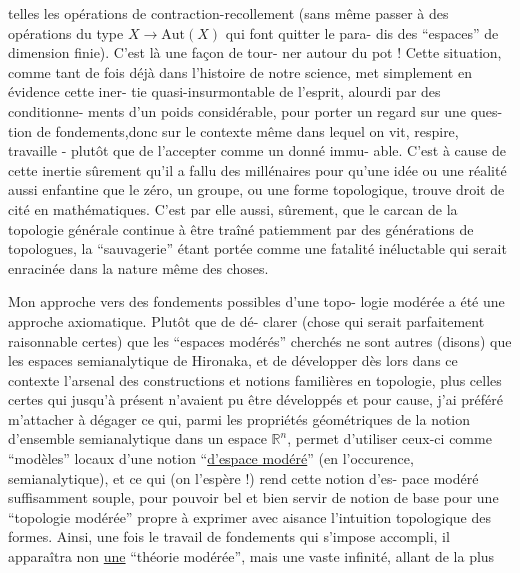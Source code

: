 
telles les opérations de contraction-recollement (sans même passer
à des opérations du type $X \longrightarrow \mathrm{Aut}(X)$ qui font quitter le para-%
dis des ``espaces'' de dimension finie). C'est là une façon de tour-%
ner autour du pot ! Cette situation, comme tant de fois déjà dans
l'histoire de notre science, met simplement en évidence cette iner-%
tie quasi-insurmontable de l'esprit, alourdi par des conditionne-%
ments d'un poids considérable, pour porter un regard sur une ques-%
tion de fondements,donc sur le contexte même dans lequel on vit,
respire, travaille - plutôt que de l'accepter comme un donné immu-%
able. C'est à cause de cette inertie sûrement qu'il a fallu des
millénaires pour qu'une idée ou une réalité aussi enfantine que
le zéro, un groupe, ou une forme topologique, trouve droit de cité
en mathématiques. C'est par elle aussi, sûrement, que le carcan
de la topologie générale continue à être traîné patiemment par
des générations de topologues, la ``sauvagerie'' étant portée comme
une fatalité inéluctable qui serait enracinée dans la nature même
des choses.

Mon approche vers des fondements possibles d'une topo-%
logie modérée a été une approche axiomatique. Plutôt que de dé-%
clarer (chose qui serait parfaitement raisonnable certes) que
les ``espaces modérés'' cherchés ne sont autres (disons) que les
espaces semianalytique de Hironaka, et de développer dès lors dans
ce contexte l'arsenal des constructions et notions familières en
topologie, plus celles certes qui jusqu'à présent n'avaient pu
être développés et pour cause, j'ai préféré m'attacher à dégager
ce qui, parmi les propriétés géométriques de la notion d'ensemble
semianalytique dans un espace $\mathbb{R}^{n}$, permet d'utiliser ceux-ci comme
``modèles'' locaux d'une notion ``\uline{d'espace modéré}'' (en l'occurence,
semianalytique), et ce qui (on l'espère !) rend cette notion d'es-%
pace modéré suffisamment souple, pour pouvoir bel et bien servir
de notion de base pour une ``topologie modérée'' propre à exprimer
avec aisance l'intuition topologique des formes. Ainsi, une fois
le travail de fondements qui s'impose accompli, il apparaîtra non
\uline{une} ``théorie modérée'', mais une vaste infinité, allant de la plus

